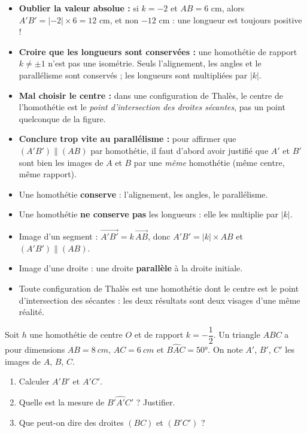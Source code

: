 \documentclass[11pt]{article}
\begin{document}
\begin{attention}
\begin{itemize}
\item \textbf{Oublier la valeur absolue :} si $k = -2$ et $AB = 6$ cm, alors $A'B' = |-2| \times 6 = 12$ cm, et non $-12$ cm : une longueur est toujours positive !
\item \textbf{Croire que les longueurs sont conservées :} une homothétie de rapport $k \neq \pm 1$ n'est pas une isométrie. Seuls l'alignement, les angles et le parallélisme sont conservés ; les longueurs sont multipliées par $|k|$.
\item \textbf{Mal choisir le centre :} dans une configuration de Thalès, le centre de l'homothétie est le \emph{point d'intersection des droites sécantes}, pas un point quelconque de la figure.
\item \textbf{Conclure trop vite au parallélisme :} pour affirmer que $(A'B') \parallel (AB)$ par homothétie, il faut d'abord avoir justifié que $A'$ et $B'$ sont bien les images de $A$ et $B$ par une \emph{même} homothétie (même centre, même rapport).
\end{itemize}
\end{attention}

\begin{aretenir}
\begin{itemize}
\item Une homothétie \textbf{conserve} : l'alignement, les angles, le parallélisme.
\item Une homothétie \textbf{ne conserve pas} les longueurs : elle les multiplie par $|k|$.
\item Image d'un segment : $\overrightarrow{A'B'} = k\,\overrightarrow{AB}$, donc $A'B' = |k| \times AB$ et $(A'B') \parallel (AB)$.
\item Image d'une droite : une droite \textbf{parallèle} à la droite initiale.
\item Toute configuration de Thalès est une homothétie dont le centre est le point d'intersection des sécantes : les deux résultats sont deux visages d'une même réalité.
\end{itemize}
\end{aretenir}

\begin{exercice}
Soit $h$ une homothétie de centre $O$ et de rapport $k = -\dfrac{1}{2}$. Un triangle $ABC$ a pour dimensions $AB = \SI{8}{cm}$, $AC = \SI{6}{cm}$ et $\widehat{BAC} = 50°$. On note $A'$, $B'$, $C'$ les images de $A$, $B$, $C$.
\begin{enumerate}
\item Calculer $A'B'$ et $A'C'$.
\item Quelle est la mesure de $\widehat{B'A'C'}$ ? Justifier.
\item Que peut-on dire des droites $(BC)$ et $(B'C')$ ?
\end{enumerate}
\end{exercice}
\end{document}
